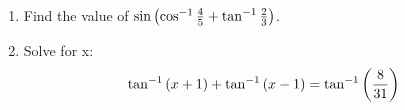 \begin{enumerate}
\item Find the value of $\sin\left(\cos^{-1}{\frac{4}{5}}+{\tan^{-1}{\frac{2}{3}}}\right)$.
\item Solve for x:
\begin{align*}
\tan^{-1}\left(x+1\right)+\tan^{-1}\left(x-1\right)=\tan^{-1}\left(\frac{8}{31}\right)
\end{align*}
\end{enumerate}

